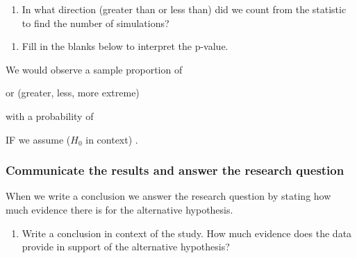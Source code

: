 \documentclass[
]{report}
\providecommand{\tightlist}{%
  \setlength{\itemsep}{0pt}\setlength{\parskip}{0pt}}
\begin{document}
\vspace{0.3in}

\begin{enumerate}
\def\labelenumi{\arabic{enumi}.}
\setcounter{enumi}{11}
\tightlist
\item
  In what direction (greater than or less than) did we count from the statistic to find the number of simulations?
  \vspace{0.3in}
\end{enumerate}

\newpage

\begin{enumerate}
\def\labelenumi{\arabic{enumi}.}
\setcounter{enumi}{12}
\tightlist
\item
  Fill in the blanks below to interpret the p-value.
\end{enumerate}


We would observe a sample proportion of \hrulefill  

or (greater, less, more extreme) \hrulefill   

with a probability of \hrulefill  

IF we assume (\(H_0\) in context) \hrulefill.

\hrulefill

\vspace{12pt}

\subsubsection*{Communicate the results and answer the research question}\label{communicate-the-results-and-answer-the-research-question}

When we write a conclusion we answer the research question by stating how much evidence there is for the alternative hypothesis.

\begin{enumerate}
\def\labelenumi{\arabic{enumi}.}
\setcounter{enumi}{13}
\tightlist
\item
  Write a conclusion in context of the study. How much evidence does the data provide in support of the alternative hypothesis?
\end{enumerate}

\vspace{0.6in}

\end{document}
